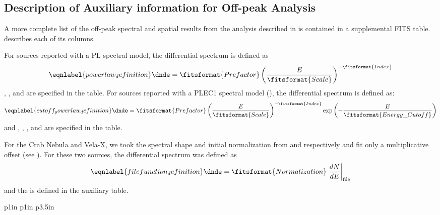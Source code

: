 \subsection{Description of Auxiliary information for Off-peak Analysis}
\label{off_peak_auxiliary}

A more complete list of the off-peak spectral and spatial 
results from the analysis described in 
is contained
in a supplemental FITS table.
 describes each of its columns.

For sources reported with a PL spectral model,
the differential spectrum is defined as
\begin{equation}\eqnlabel{powerlaw_definition}
  \dnde = \fitsformat{Prefactor} \left(\frac{E}{\fitsformat{Scale}}\right)^{-\fitsformat{Index}}
\end{equation}
, , and  are specified in the table.
For sources reported with a PLEC1 spectral model (\fitsformat{\PLSuperExpCutoff}), the differential spectrum is defined as:
\begin{equation}\eqnlabel{cutoff_powerlaw_definition}
  \dnde = \fitsformat{Prefactor} \left(\frac{E}{\fitsformat{Scale}}\right)^{-\fitsformat{Index}} \exp\left(-\frac{E}{\fitsformat{Energy\_Cutoff}}\right)
\end{equation}
and , , , and  are specified in the table.

For the Crab Nebula and Vela-X, we took the spectral shape and
initial normalization from \citet{LAT_collaboration_crab_2012} and
\cite{FermiVelaX2nd} respectively
and fit only a
multiplicative offset (see ). For these two
sources, the differential spectrum was defined as
\begin{equation}\eqnlabel{filefunction_definition}
  \dnde = \fitsformat{Normalization} \left.\frac{dN}{dE}\right|_\mathrm{file}
\end{equation}
and the  is defined in the auxiliary table.

\begin{deluxetable}{p{1in} p{1in} p{3.5in}}
\tablewidth{0pt}
\tabletypesize{\scriptsize}
\tablewidth{6in}

\end{deluxetable}
\clearpage
